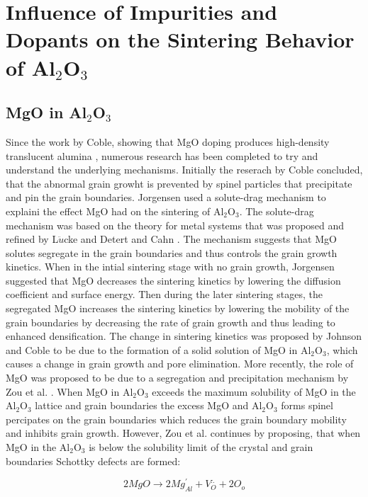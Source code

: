 \section{Influence of Impurities and Dopants on the Sintering Behavior of Al$_{2}$O$_{3}$}

\subsection{MgO in Al$_{2}$O$_{3}$}

Since the work by Coble, showing that MgO doping produces high-density translucent alumina \cite{Coble1961,Coble1962,Coble1962a}, numerous research has been completed to try and understand the underlying mechanisms. Initially the reserach by Coble concluded, that the abnormal grain growht is prevented by spinel particles that precipitate and pin the grain boundaries. Jorgensen \cite{Jorgensen1964,Jorgensen1965} used a solute-drag mechanism to explaini the effect MgO had on the sintering of Al$_{2}$O$_{3}$. The solute-drag mechanism was based on the theory for metal systems that was proposed and refined by L$\ddot{u}$cke and Detert \cite{Lucke1957} and Cahn \cite{Cahn1962}. The mechanism suggests that MgO solutes segregate in the grain boundaries and thus controls the grain growth kinetics. When in the intial sintering stage with no grain growth, Jorgensen suggested that MgO decreases the sintering kinetics by lowering the diffusion coefficient and surface energy. Then during the later sintering stages, the segregated MgO increases the sintering kinetics by lowering the mobility of the grain boundaries by decreasing the rate of grain growth and thus leading to enhanced densification. The change in sintering kinetics was proposed by Johnson and Coble \cite{Johnson1978} to be due to the formation of a solid solution of MgO in Al$_{2}$O$_{3}$, which causes a change in grain growth and pore elimination. More recently, the role of MgO was proposed to be due to a segregation and precipitation mechanism by Zou et al. \cite{Zuo2013}. When MgO in Al$_{2}$O$_{3}$ exceeds the maximum solubility of MgO in the Al$_{2}$O$_{3}$ lattice and grain boundaries the excess MgO and Al$_{2}$O$_{3}$ forms spinel percipates on the grain boundaries which reduces the grain boundary mobility and inhibits grain growth. However, Zou et al. \cite{Zuo2013} continues by proposing, that when MgO in the Al$_{2}$O$_{3}$ is below the solubility limit of the crystal and grain boundaries Schottky defects are formed:

\begin{equation}
\label{Ch1-eq: 1}
2MgO \rightarrow 2Mg_{Al}^{'} + V^{..}_{O} + 2O_{o}
\end{equation}
	
